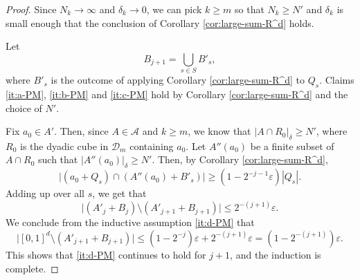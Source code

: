 \documentclass[10pt,a4paper]{amsart}
\newcommand{\cD}{\mathcal{D}}
\newcommand{\e}{\varepsilon}
\begin{document}
\begin{proof}
    Since $N_k\to\infty$ and $\delta_k\to 0$, we can pick $k\ge m$ so that $N_k\ge N'$ and $\delta_k$ is small enough that the conclusion of Corollary \ref{cor:large-sum-R^d} holds.

    Let
    \[
        B_{j+1} = \bigcup_{s\in S} B'_s,
    \]
    where $B'_s$ is the outcome of applying Corollary \ref{cor:large-sum-R^d} to $Q_s$.  Claims \ref{it:a-PM}, \ref{it:b-PM} and \ref{it:c-PM} hold by Corollary \ref{cor:large-sum-R^d} and the choice of $N'$.

    Fix $a_0\in A'$. Then, since $A\in\mathcal{A}$ and $k\ge m$, we know that $|A\cap R_0|_{\delta}\ge N'$, where $R_0$ is the dyadic cube in $\cD_{m}$ containing $a_0$. Let $A''(a_0)$ be a finite subset of $A\cap R_0$ such that $|A''(a_0)|_{\delta}\ge N'$. Then, by Corollary \ref{cor:large-sum-R^d},
    \[
        \bigl| (a_0+Q_s)\cap (A''(a_0) + B'_s) \bigr| \ge \left(1-2^{-j-1}\e\right)|Q_s|.
    \]
    Adding up over all $s$, we get that
    \[
        \bigl| (A'_j  + B_j) \setminus (A'_{j+1} + B_{j+1})\bigr| \le 2^{-(j+1)}\e.
    \]
    We conclude from the inductive assumption \ref{it:d-PM} that
    \[
        \bigl| [0,1]^d\setminus (A'_{j+1}+B_{j+1})\bigr| \le (1-2^{-j})\e + 2^{-(j+1)}\e = (1-2^{-(j+1)})\e.
    \]
    This shows that \ref{it:d-PM} continues to hold for $j+1$, and the induction is complete.
\end{proof}
\end{document}
